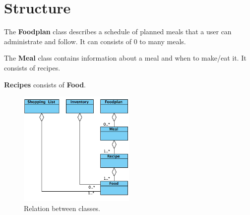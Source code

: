 \section{Structure}
The \textbf{Foodplan} class describes a schedule of planned meals that a user can administrate and follow.
It can consists of 0 to many meals.

The \textbf{Meal} class contains information about a meal and when to make/eat it. It consists of recipes.

\textbf{Recipes} consists of \textbf{Food}.

\begin{figure}[H]
	\centering
	\includegraphics[width=0.50\textwidth]{Grafik/FoodPlanner/FoodPlannerClassDiagram.png}
	\caption{Relation between classes.}
\end{figure}

